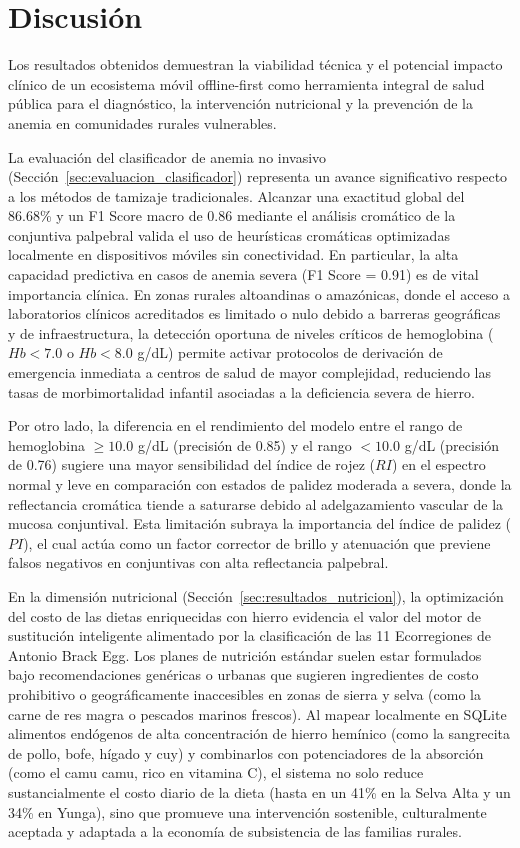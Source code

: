 \section{Discusión}
\label{sec:discusion}

Los resultados obtenidos demuestran la viabilidad técnica y el potencial impacto clínico de un ecosistema móvil offline-first como herramienta integral de salud pública para el diagnóstico, la intervención nutricional y la prevención de la anemia en comunidades rurales vulnerables.

La evaluación del clasificador de anemia no invasivo (Sección~\ref{sec:evaluacion_clasificador}) representa un avance significativo respecto a los métodos de tamizaje tradicionales. Alcanzar una exactitud global del 86.68\% y un F1 Score macro de 0.86 mediante el análisis cromático de la conjuntiva palpebral valida el uso de heurísticas cromáticas optimizadas localmente en dispositivos móviles sin conectividad. En particular, la alta capacidad predictiva en casos de anemia severa (F1 Score = 0.91) es de vital importancia clínica. En zonas rurales altoandinas o amazónicas, donde el acceso a laboratorios clínicos acreditados es limitado o nulo debido a barreras geográficas y de infraestructura, la detección oportuna de niveles críticos de hemoglobina ($Hb < 7.0$ o $Hb < 8.0$ g/dL) permite activar protocolos de derivación de emergencia inmediata a centros de salud de mayor complejidad, reduciendo las tasas de morbimortalidad infantil asociadas a la deficiencia severa de hierro.

Por otro lado, la diferencia en el rendimiento del modelo entre el rango de hemoglobina $\ge 10.0$ g/dL (precisión de 0.85) y el rango $< 10.0$ g/dL (precisión de 0.76) sugiere una mayor sensibilidad del índice de rojez ($RI$) en el espectro normal y leve en comparación con estados de palidez moderada a severa, donde la reflectancia cromática tiende a saturarse debido al adelgazamiento vascular de la mucosa conjuntival. Esta limitación subraya la importancia del índice de palidez ($PI$), el cual actúa como un factor corrector de brillo y atenuación que previene falsos negativos en conjuntivas con alta reflectancia palpebral.

En la dimensión nutricional (Sección~\ref{sec:resultados_nutricion}), la optimización del costo de las dietas enriquecidas con hierro evidencia el valor del motor de sustitución inteligente alimentado por la clasificación de las 11 Ecorregiones de Antonio Brack Egg. Los planes de nutrición estándar suelen estar formulados bajo recomendaciones genéricas o urbanas que sugieren ingredientes de costo prohibitivo o geográficamente inaccesibles en zonas de sierra y selva (como la carne de res magra o pescados marinos frescos). Al mapear localmente en SQLite alimentos endógenos de alta concentración de hierro hemínico (como la sangrecita de pollo, bofe, hígado y cuy) y combinarlos con potenciadores de la absorción (como el camu camu, rico en vitamina C), el sistema no solo reduce sustancialmente el costo diario de la dieta (hasta en un 41\% en la Selva Alta y un 34\% en Yunga), sino que promueve una intervención sostenible, culturalmente aceptada y adaptada a la economía de subsistencia de las familias rurales.

